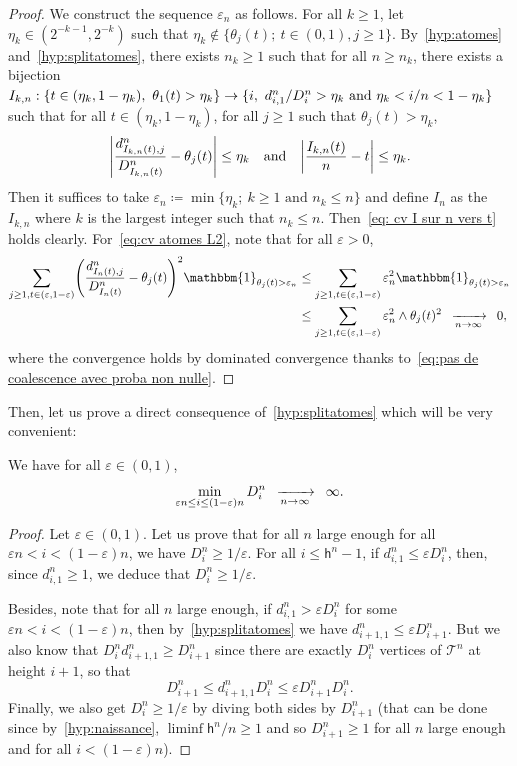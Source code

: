 \documentclass[AHL,Unicode,published]{cedram}
\newcommand{\e}{\varepsilon}
\newcommand{\cv}[1][n]{\enskip\xrightarrow[#1 \to \infty]{}\enskip}
\newcommand{\1}{\mathbbm{1}}
\newcommand{\T}{\mathcal{T}}
\newcommand{\h}{\mathsf{h}}
\let\originalleft\left
\let\originalright\right
\renewcommand{\left}{\mathopen{}\mathclose\bgroup\originalleft}
\renewcommand{\right}{\aftergroup\egroup\originalright}
\renewcommand*{\to}{\mathchoice{\longrightarrow}{\rightarrow}{\rightarrow}{\rightarrow}}
\begin{document}
\begin{proof}
We construct the sequence $\e_n$ as follows. For all $k \ge 1$, let $\eta_k \in (2^{-k-1},2^{-k})$ such that $\eta_k \not \in \{\theta_j(t); \ t \in (0,1), j\ge 1\}$. By~\ref{hyp:atomes} and~\ref{hyp:splitatomes}, there exists $n_k\ge 1$ such that for all $n\ge n_k$, there exists a bijection~$I_{k,n}: \{t \in (\eta_k,1-\eta_k), \ \theta_1(t)> \eta_k\} \to \{i, \ d^n_{i,1}/D^n_i > \eta_k \text{ and } \eta_k < i/n < 1-\eta_k \}$ such that for all $t \in (\eta_k, 1-\eta_k)$, for all $j\ge 1$ such that $\theta_j(t)>\eta_k$,
\[
\left|\frac{d^n_{I_{k,n}(t),j}}{D^n_{I_{k,n}(t)}} - \theta_j(t) \right| \le \eta_k \quad \text{and} \quad
\left|\frac{I_{k,n}(t)}{n} -t \right| \le \eta_k.
\]
Then it suffices to take $\e_n \coloneqq \min\{\eta_k; \ k\ge 1 \text{ and } n_k \le n\}$ and define $I_n$ as the $I_{k,n}$ where $k$ is the largest integer such that $n_k \le n$. Then~\eqref{eq: cv I sur n vers t} holds clearly. For~\eqref{eq:cv atomes L2}, note that for all $\e>0$,
\begin{align*}
\sum_{j \ge 1, t\in (\e, 1-\e)}
\left(
\frac{d^n_{I_n(t), j}}{D^n_{I_n(t)}} - \theta_j(t)
\right)^2
\1_{\theta_j(t)>\e_n } &\le \sum_{j \ge 1, t\in (\e, 1-\e)} \e_n^2 \1_{\theta_j(t)>\e_n }\\
&\le \sum_{j \ge 1, t\in (\e, 1-\e)} \e_n^2\wedge \theta_j(t)^2
\cv[n] 0,
\end{align*}
where the convergence holds by dominated convergence thanks to~\eqref{eq:pas de coalescence avec proba non nulle}.
\end{proof}

Then, let us prove a direct consequence of~\ref{hyp:splitatomes} which will be very convenient:

\begin{lemm}\label{lemme profil tend vers l'infini}
We have for all $\e \in (0,1)$,
\[
\min_{ \e n \le i \le (1-\e)n} D^n_i \cv[n] \infty.
\]
\end{lemm}

\begin{proof}
Let $\e\in (0,1)$. Let us prove that for all $n$ large enough for all $\e n < i < (1-\e) n$, we have $D^n_i \ge 1/ \e$. For all $i \le \h^n -1$, if $d^n_{i,1} \le \e D^n_i$, then, since $d^n_{i,1}\ge 1$, we deduce that $D^n_i \ge 1/\e$.

Besides, note that for all $n$ large enough, if $d^n_{i,1} > \e D^n_i$ for some $\e n < i <(1-\e) n$, then by~\ref{hyp:splitatomes} we have $d^n_{i+1, 1} \le \e D^n_{i+1}$. But we also know that $D^n_i d^n_{i+1,1} \ge D^n_{i+1}$ since there are exactly $D^n_i$ vertices of $\T^n$ at height $i+1$, so that
\[
D_{i+1}^n \le d^n_{i+1,1} D^n_i \le \e D^n_{i+1} D^n_i.
\]
Finally, we also get $D^n_i \ge 1/ \e$ by diving both sides by $D_{i+1}^n$ (that can be done since by~\ref{hyp:naissance}, $\liminf \h^n/n \ge 1$ and so $D_{i+1}^n\ge 1$ for all $n$ large enough and for all $i< (1-\e) n $).
\end{proof}
\end{document}
